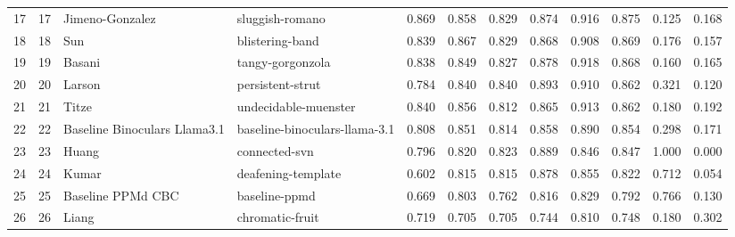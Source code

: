 \begin{tabular}{lrllrrrrrrrr}
17 & 17 & Jimeno-Gonzalez & sluggish-romano & 0.869 & 0.858 & 0.829 & 0.874 & 0.916 & 0.875 & 0.125 & 0.168 \\
18 & 18 & Sun & blistering-band & 0.839 & 0.867 & 0.829 & 0.868 & 0.908 & 0.869 & 0.176 & 0.157 \\
19 & 19 & Basani & tangy-gorgonzola & 0.838 & 0.849 & 0.827 & 0.878 & 0.918 & 0.868 & 0.160 & 0.165 \\
20 & 20 & Larson & persistent-strut & 0.784 & 0.840 & 0.840 & 0.893 & 0.910 & 0.862 & 0.321 & 0.120 \\
21 & 21 & Titze & undecidable-muenster & 0.840 & 0.856 & 0.812 & 0.865 & 0.913 & 0.862 & 0.180 & 0.192 \\
22 & 22 & Baseline Binoculars Llama3.1 & baseline-binoculars-llama-3.1 & 0.808 & 0.851 & 0.814 & 0.858 & 0.890 & 0.854 & 0.298 & 0.171 \\
23 & 23 & Huang & connected-svn & 0.796 & 0.820 & 0.823 & 0.889 & 0.846 & 0.847 & 1.000 & 0.000 \\
24 & 24 & Kumar & deafening-template & 0.602 & 0.815 & 0.815 & 0.878 & 0.855 & 0.822 & 0.712 & 0.054 \\
25 & 25 & Baseline PPMd CBC & baseline-ppmd & 0.669 & 0.803 & 0.762 & 0.816 & 0.829 & 0.792 & 0.766 & 0.130 \\
26 & 26 & Liang & chromatic-fruit & 0.719 & 0.705 & 0.705 & 0.744 & 0.810 & 0.748 & 0.180 & 0.302 \\
\bottomrule
\end{tabular}

